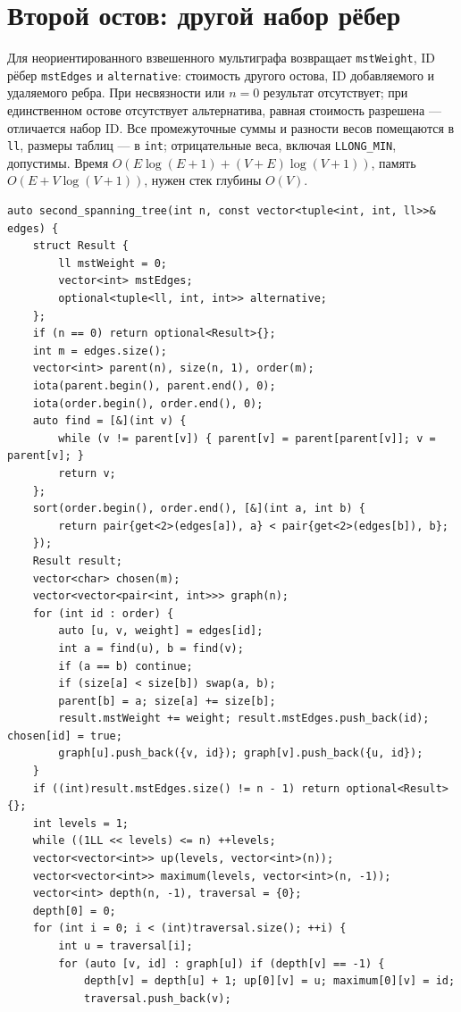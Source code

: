 \section{Второй остов: другой набор рёбер}
Для неориентированного взвешенного мультиграфа возвращает \texttt{mstWeight}, ID рёбер \texttt{mstEdges} и \texttt{alternative}: стоимость другого остова, ID добавляемого и удаляемого ребра.
При несвязности или $n=0$ результат отсутствует; при единственном остове отсутствует альтернатива, равная стоимость разрешена --- отличается набор ID.
Все промежуточные суммы и разности весов помещаются в \texttt{ll}, размеры таблиц --- в \texttt{int}; отрицательные веса, включая \texttt{LLONG\_MIN}, допустимы.
Время $O(E\log(E+1)+(V+E)\log(V+1))$, память $O(E+V\log(V+1))$, нужен стек глубины $O(V)$.
\begin{lstlisting}[name=advanced_graph_second_mst]
auto second_spanning_tree(int n, const vector<tuple<int, int, ll>>& edges) {
    struct Result {
        ll mstWeight = 0;
        vector<int> mstEdges;
        optional<tuple<ll, int, int>> alternative;
    };
    if (n == 0) return optional<Result>{};
    int m = edges.size();
    vector<int> parent(n), size(n, 1), order(m);
    iota(parent.begin(), parent.end(), 0);
    iota(order.begin(), order.end(), 0);
    auto find = [&](int v) {
        while (v != parent[v]) { parent[v] = parent[parent[v]]; v = parent[v]; }
        return v;
    };
    sort(order.begin(), order.end(), [&](int a, int b) {
        return pair{get<2>(edges[a]), a} < pair{get<2>(edges[b]), b};
    });
    Result result;
    vector<char> chosen(m);
    vector<vector<pair<int, int>>> graph(n);
    for (int id : order) {
        auto [u, v, weight] = edges[id];
        int a = find(u), b = find(v);
        if (a == b) continue;
        if (size[a] < size[b]) swap(a, b);
        parent[b] = a; size[a] += size[b];
        result.mstWeight += weight; result.mstEdges.push_back(id); chosen[id] = true;
        graph[u].push_back({v, id}); graph[v].push_back({u, id});
    }
    if ((int)result.mstEdges.size() != n - 1) return optional<Result>{};
    int levels = 1;
    while ((1LL << levels) <= n) ++levels;
    vector<vector<int>> up(levels, vector<int>(n));
    vector<vector<int>> maximum(levels, vector<int>(n, -1));
    vector<int> depth(n, -1), traversal = {0};
    depth[0] = 0;
    for (int i = 0; i < (int)traversal.size(); ++i) {
        int u = traversal[i];
        for (auto [v, id] : graph[u]) if (depth[v] == -1) {
            depth[v] = depth[u] + 1; up[0][v] = u; maximum[0][v] = id;
            traversal.push_back(v);

\end{lstlisting}
